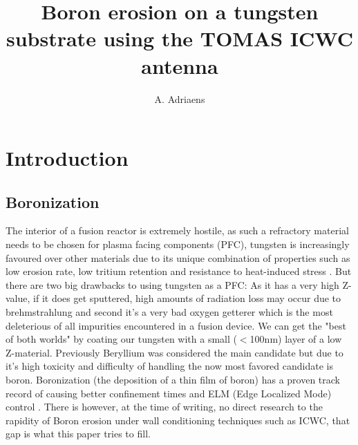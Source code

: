 \documentclass{article}
\title{Boron erosion on a tungsten substrate using the TOMAS ICWC antenna}
\author[1,2]{A. Adriaens}
\affil[1]{Laboratory for Plasma Physics LPP-ERM/KMS, Brussels, Belgium}
\affil[2]{Department of Applied Physics, Ghent University, Belgium}
\date{}
\begin{document}
\maketitle
\section{Introduction}
\subsection{Boronization}
The interior of a fusion reactor is extremely hostile, as such a refractory material
needs to be chosen for plasma facing components (PFC), tungsten is increasingly
favoured over other materials due to its unique combination of properties such
as low erosion rate, low tritium retention and resistance to heat-induced
stress \cite{PHILIPPS2011S2}\cite{Tungsten}.  But there are two big drawbacks to
using tungsten as a PFC: As it has a very high Z-value, if it does get
sputtered, high amounts of radiation loss may occur due to brehmstrahlung
\cite{JWinter_1996} and second it's a very bad oxygen getterer which is the most deleterious
of all impurities encountered in a fusion device. We can get the "best of both worlds" by
coating our tungsten with a small ($<$100nm) layer of a low Z-material.
Previously Beryllium was considered the main candidate but due to it's high
toxicity and difficulty of handling the now most favored candidate is boron.
Boronization (the deposition of a thin film of boron) has a proven track record
of causing better confinement times and ELM (Edge Localized Mode) control
\cite{ASDEXBoronisation}\cite{DIII-DBoronisation}\cite{EASTBoronisation}\cite{TEXTORBoronisation}.
There is however, at the time of writing, no direct research to the rapidity of
Boron erosion under wall conditioning techniques such as ICWC, that gap is what
this paper tries to fill.
\end{document}
